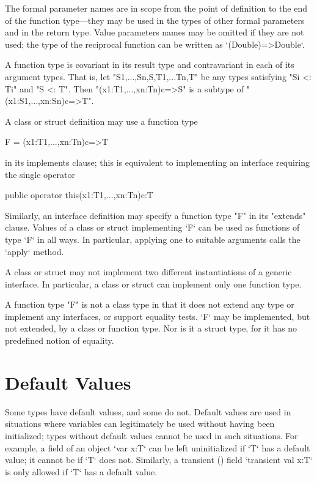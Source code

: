 
The formal parameter names are in scope from the point of definition to the
end of the function type---they may be used in the types of other formal parameters
and in the return type. 
Value parameters names may be
omitted if they are not used; the type of the reciprocal function can be
written as
\xcd`(Double)=>Double`. 

A function type is covariant in its result type and contravariant in
each of its argument types. That is, let 
\xcd"S1,...,Sn,S,T1,...Tn,T" be any
types satisfying \xcd"Si <: Ti" and \xcd"S <: T". Then
\xcd"(x1:T1,...,xn:Tn){c}=>S" is a subtype of
\xcd"(x1:S1,...,xn:Sn){c}=>T".

A class or struct definition may use a function type 
\begin{xtenmath}
F = (x1:T1,...,xn:Tn){c}=>T
\end{xtenmath}
in its 
implements clause; 
this is equivalent to implementing an interface requiring the single operator
\begin{xtenmath}
public operator this(x1:T1,...,xn:Tn){c}:T
\end{xtenmath}
Similarly, an interface
definition may specify a function type \xcd"F" in its \xcd"extends" clause.
Values of a class or struct implementing \xcd`F` 
can be used as functions of type \xcd`F` in all ways.  
In particular, applying one to suitable arguments calls the \xcd`apply`
method. 

\limitationx{} A class or struct may not implement two different
instantiations of a generic interface. In particular, a class or
struct can implement only one function type.


A function type \xcd"F" is not a class type in that it does not extend any
type or implement any interfaces, or support equality tests. 
\xcd`F` may be implemented, but not extended, by a class or function type. 
Nor is it a struct type, for it has no predefined notion of equality.


\section{Default Values}
\label{DefaultValues}

Some types have default values, and some do not. Default values are used in
situations where variables can legitimately be used without having been
initialized; types without default values cannot be used in such situations.
For example, a field of an object \xcd`var x:T` can be left uninitialized if
\xcd`T` has a default value; it cannot be if \xcd`T` does not. Similarly, a
transient () field \xcd`transient val x:T` is only
allowed if \xcd`T` has a default value.

